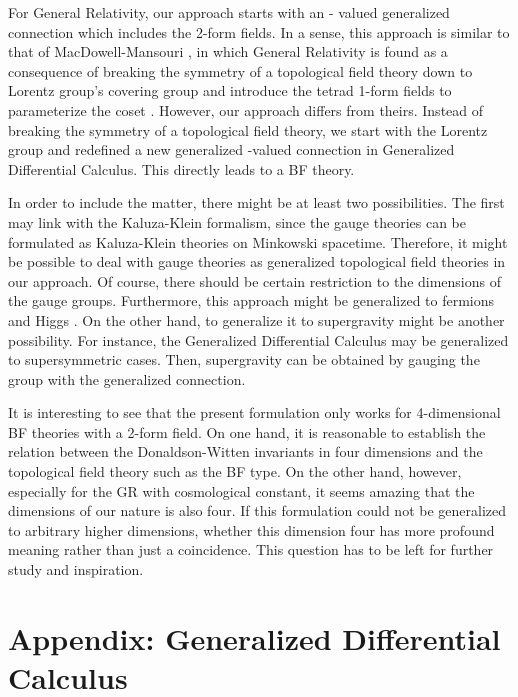 \documentclass[a4paper,twocolumn,showpacs,prd]{revtex4}
\begin{document}
%
For General Relativity, our approach starts with an \coordHE{}-
valued generalized connection which includes the 2-form \coordHE{}
fields. In a sense, this approach is similar to that of
MacDowell-Mansouri \cite{MM}, in which General Relativity is found
as a consequence of breaking the \coordHE{} symmetry of a topological
field theory down to Lorentz group's covering group \coordHE{} and
introduce the tetrad 1-form fields \coordHE{} to parameterize the
coset \coordHE{}. However, our approach differs from theirs.
Instead of breaking the symmetry of a topological field theory, we
start with the Lorentz group and redefined a new generalized
\coordHE{}-valued connection in Generalized Differential Calculus.
This directly leads to a BF theory.

In order to include the matter, there might be at least two
possibilities. The first may link with the Kaluza-Klein formalism,
since the gauge theories can be formulated as Kaluza-Klein
theories on Minkowski spacetime. Therefore,  it might be possible
to deal with gauge theories as generalized topological field
theories in our approach. Of course, there should be certain
restriction to the dimensions of the gauge groups. Furthermore,
this approach might be generalized to fermions and Higgs
\cite{liu}. On the other hand, to generalize it to supergravity
might be another possibility. For instance, the Generalized
Differential Calculus may be generalized to supersymmetric cases.
Then, supergravity can be obtained by gauging the \coordHE{} group
with the generalized connection.

It is interesting to see that the present formulation only works
for 4-dimensional BF theories with \coordHE{} a 2-form field. On one
hand, it is reasonable to establish the relation between the
Donaldson-Witten invariants in four dimensions and the topological
field theory such as the BF type. On the other hand, however,
especially for the GR with cosmological constant, it seems amazing
that the dimensions of our nature is also four. If this
formulation could not be generalized to arbitrary higher
dimensions, whether  this dimension four has more profound meaning
rather than just a coincidence. This question has to be left for
further study and inspiration.

\section*{Appendix: Generalized Differential Calculus}
\end{document}
